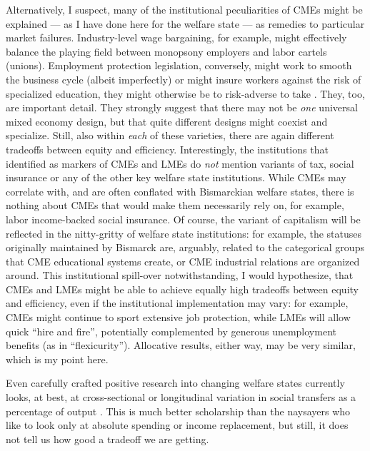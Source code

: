 \documentclass[11pt,a4paper,oneside,openright]{article}
\begin{document}
\begin{enumerate}
{		Alternatively, I suspect, many of the institutional peculiarities of \glspl{CME} might be explained --- as I have done here for the welfare state --- as remedies to particular market failures. 
		Industry-level wage bargaining, for example, might effectively balance the playing field between monopsony employers and labor cartels (unions). 
		Employment protection legislation, conversely, might work to smooth the business cycle (albeit imperfectly) or might insure workers against the risk of specialized education, they might otherwise be to risk-adverse to take \citep[e.g.][444]{Offe2003}
	}. 
	They, too, are important detail. 
	They strongly suggest that there may not be \emph{one} universal mixed economy design, but that quite different designs might coexist and specialize. 
	Still, also within \emph{each} of these varieties, there are again different tradeoffs between equity and efficiency. 
	Interestingly, the institutions that \citeauthor{HallSoskice-2001-aa} identified as markers of \glspl{CME} and \glspl{LME} do \emph{not} mention variants of tax, social insurance or any of the other key welfare state institutions. 
	While \glspl{CME} may correlate with, and are often conflated with Bismarckian welfare states, there is nothing about \glspl{CME} that would make them necessarily rely on, for example, labor income-backed social insurance. 
	Of course, the variant of capitalism will be reflected in the nitty-gritty of welfare state institutions: 
	for example, the statuses originally maintained by Bismarck are, arguably, related to the categorical groups that \gls{CME} educational systems create, or \gls{CME} industrial relations are organized around. 
	This institutional spill-over notwithstanding, I would hypothesize, that \glspl{CME} and \glspl{LME} might be able to achieve equally high tradeoffs between equity and efficiency, even if the institutional implementation may vary: 
	for example, \glspl{CME} might continue to sport extensive job protection, while \glspl{LME} will allow quick ``hire and fire'', potentially complemented by generous unemployment benefits (as in ``flexicurity''). Allocative results, either way, may be very similar, which is my point here.
	
	Even carefully crafted positive research into changing welfare states currently looks, at best, at cross-sectional or longitudinal variation in social transfers as a percentage of output \citep[e.g.][249]{Ravenhill2005}.
	This is much better scholarship than the naysayers who like to look only at absolute spending or income replacement, but still, it does not tell us how good a tradeoff we are getting.
	

\end{enumerate}
\end{document}
